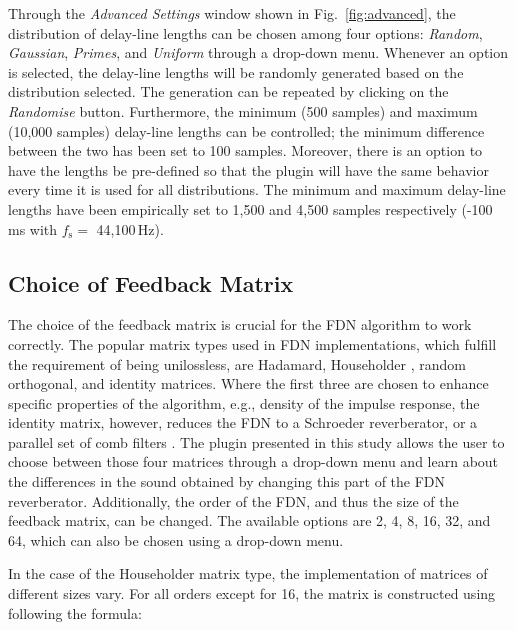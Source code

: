 \documentclass[twoside,a4paper]{article}
\newcommand{\silvin}[1]{\textcolor{ForestGreen}{#1}}
\begin{document}
Through the \textit{Advanced Settings} window shown in Fig.~\ref{fig:advanced}, the distribution of delay-line lengths can be chosen among four options: \textit{Random}, \textit{Gaussian}, \textit{Primes}, and \textit{Uniform} through a drop-down menu. Whenever an option is selected, the delay-line lengths will be randomly generated based on the distribution selected. The generation can be repeated by clicking on the \textit{Randomise} button. Furthermore, the minimum (500 samples) and maximum (10,000 samples) delay-line lengths can be controlled; the minimum difference between the two has been set to 100 samples. 
Moreover, there is an option to have the lengths be pre-defined so that the plugin will have the same behavior every time it is used for all distributions. The minimum and maximum delay-line lengths have been empirically set to 1,500 and 4,500 samples respectively (-100\,ms with $f_\text{s} =$  44,100\,Hz).


\subsection{Choice of Feedback Matrix}

The choice of the feedback matrix is crucial for the FDN algorithm to work correctly. The popular matrix types used in FDN implementations, which fulfill the requirement of being unilossless, are Hadamard, Householder \cite{Jot:1997:icm}, random orthogonal, and identity matrices. Where the first three are chosen to enhance specific properties of the algorithm, e.g., density of the impulse response, the identity matrix, however, reduces the FDN to a Schroeder reverberator, or a parallel set of comb filters \cite{Jot:Chaine:1991:aes, menzer2010unitary}. The plugin presented in this study allows the user to choose between those four matrices through a drop-down menu and learn about the differences in the sound obtained by changing this part of the FDN reverberator. %
%
Additionally, the order of the FDN, and thus the size of the feedback matrix, can be changed. The available options are 2, 4, 8, 16, 32, and 64, which can also be chosen using a drop-down menu. %

In the case of the Householder matrix type, the implementation of matrices of different sizes vary. For all orders except for 16, the matrix is constructed using following the formula:
\end{document}

